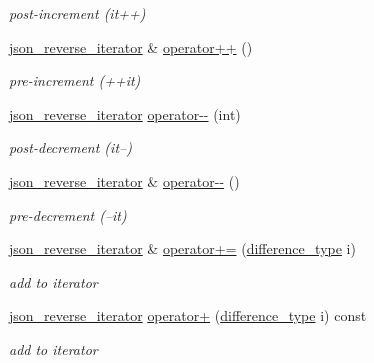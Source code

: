 \begin{DoxyCompactItemize}
\begin{DoxyCompactList}\small\item\em post-\/increment (it++) \end{DoxyCompactList}\item 
\hyperlink{classnlohmann_1_1basic__json_1_1json__reverse__iterator}{json\-\_\-reverse\-\_\-iterator} \& \hyperlink{classnlohmann_1_1basic__json_1_1json__reverse__iterator_a4aede52d6ee253a510897518b59e09c0}{operator++} ()
\begin{DoxyCompactList}\small\item\em pre-\/increment (++it) \end{DoxyCompactList}\item 
\hyperlink{classnlohmann_1_1basic__json_1_1json__reverse__iterator}{json\-\_\-reverse\-\_\-iterator} \hyperlink{classnlohmann_1_1basic__json_1_1json__reverse__iterator_a693439bffe56a9a8cf53bc4a06b911ff}{operator-\/-\/} (int)
\begin{DoxyCompactList}\small\item\em post-\/decrement (it--) \end{DoxyCompactList}\item 
\hyperlink{classnlohmann_1_1basic__json_1_1json__reverse__iterator}{json\-\_\-reverse\-\_\-iterator} \& \hyperlink{classnlohmann_1_1basic__json_1_1json__reverse__iterator_a563a7bd281e9919798d18396107fb05c}{operator-\/-\/} ()
\begin{DoxyCompactList}\small\item\em pre-\/decrement (--it) \end{DoxyCompactList}\item 
\hyperlink{classnlohmann_1_1basic__json_1_1json__reverse__iterator}{json\-\_\-reverse\-\_\-iterator} \& \hyperlink{classnlohmann_1_1basic__json_1_1json__reverse__iterator_a9accc9dd9f9033f50c0ab6bcf337ffe0}{operator+=} (\hyperlink{classnlohmann_1_1basic__json_aec316934a555dd1acdd3600e5d4a4cdf}{difference\-\_\-type} i)
\begin{DoxyCompactList}\small\item\em add to iterator \end{DoxyCompactList}\item 
\hyperlink{classnlohmann_1_1basic__json_1_1json__reverse__iterator}{json\-\_\-reverse\-\_\-iterator} \hyperlink{classnlohmann_1_1basic__json_1_1json__reverse__iterator_a99ee137dab7e5c948457f6a5321b54b1}{operator+} (\hyperlink{classnlohmann_1_1basic__json_aec316934a555dd1acdd3600e5d4a4cdf}{difference\-\_\-type} i) const 
\begin{DoxyCompactList}\small\item\em add to iterator \end{DoxyCompactList}\item 

\end{DoxyCompactItemize}
